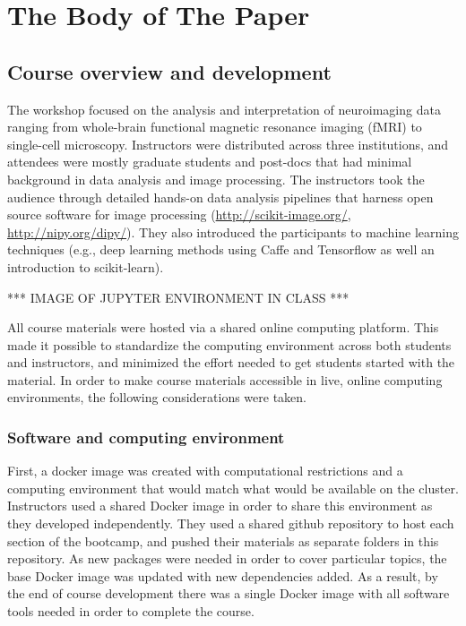 \section{The Body of The Paper}

\subsection{Course overview and development}

The workshop focused on the analysis and interpretation of neuroimaging data
ranging from whole-brain functional magnetic resonance imaging (fMRI) to
single-cell microscopy. Instructors were distributed across three institutions,
and attendees were mostly graduate students and post-docs that had minimal
background in data analysis and image processing. The instructors took the
audience through detailed hands-on data analysis pipelines that harness open
source software for image processing  (\url{http://scikit-image.org/},
\url{http://nipy.org/dipy/}). They also introduced the participants to machine
learning techniques (e.g., deep learning methods using Caffe and Tensorflow as
well an introduction to scikit-learn).

*** IMAGE OF JUPYTER ENVIRONMENT IN CLASS ***

All course materials were hosted via a shared online computing platform. This
made it possible to standardize the computing environment across both students
and instructors, and minimized the effort needed to get students started with
the material. In order to make course materials accessible in live, online
computing environments, the following considerations were taken.

\subsubsection{Software and computing environment}

First, a docker image was created with computational restrictions and a
computing environment that would match what would be available on the cluster.
Instructors used a shared Docker image in order to share this environment as
they developed independently. They used a shared github repository to host each
section of the bootcamp, and pushed their materials as separate folders in this
repository. As new packages were needed in order to cover particular topics, the
base Docker image was updated with new dependencies added. As a result, by the
end of course development there was a single Docker image with all software
tools needed in order to complete the course.

